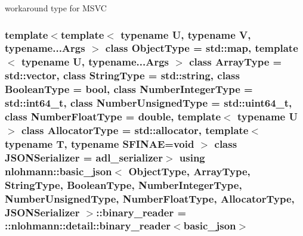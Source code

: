 workaround type for M\+S\+VC 

\subsubsection[{\texorpdfstring{binary\+\_\+reader}{binary_reader}}]{\setlength{\rightskip}{0pt plus 5cm}template$<$template$<$ typename U, typename V, typename...\+Args $>$ class Object\+Type = std\+::map, template$<$ typename U, typename...\+Args $>$ class Array\+Type = std\+::vector, class String\+Type  = std\+::string, class Boolean\+Type  = bool, class Number\+Integer\+Type  = std\+::int64\+\_\+t, class Number\+Unsigned\+Type  = std\+::uint64\+\_\+t, class Number\+Float\+Type  = double, template$<$ typename U $>$ class Allocator\+Type = std\+::allocator, template$<$ typename T, typename S\+F\+I\+N\+A\+E=void $>$ class J\+S\+O\+N\+Serializer = adl\+\_\+serializer$>$ using {\bf nlohmann\+::basic\+\_\+json}$<$ Object\+Type, Array\+Type, String\+Type, Boolean\+Type, Number\+Integer\+Type, Number\+Unsigned\+Type, Number\+Float\+Type, Allocator\+Type, J\+S\+O\+N\+Serializer $>$\+::{\bf binary\+\_\+reader} =  \+::{\bf nlohmann\+::detail\+::binary\+\_\+reader}$<${\bf basic\+\_\+json}$>$\hspace{0.3cm}{\ttfamily [private]}}\hypertarget{classnlohmann_1_1basic__json_a7e06ed27ff517575ccb23fc23fca2b8f}{}\label{classnlohmann_1_1basic__json_a7e06ed27ff517575ccb23fc23fca2b8f}
